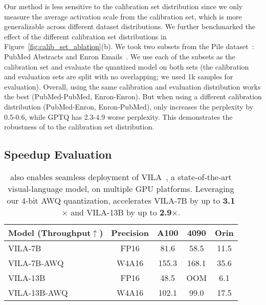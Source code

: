 Our method is less sensitive to the calibration set distribution since we only measure the average activation scale from the calibration set, which is more generalizable across different dataset distributions. We further benchmarked the effect of the different calibration set distributions in Figure~\ref{fig:calib_set_ablation}(b). We took two subsets from the Pile dataset~\cite{gao2020pile}: PubMed Abstracts and Enron Emails~\cite{klimt2004enron}. We use each of the subsets as the calibration set and evaluate the quantized model on both sets (the calibration and evaluation sets are split with no overlapping; we used 1k samples for evaluation). Overall, using the same calibration and evaluation distribution works the best (PubMed-PubMed, Enron-Enron). But when using a different calibration distribution (PubMed-Enron, Enron-PubMed), \methodshort only increases the perplexity by 0.5-0.6, while GPTQ has 2.3-4.9 worse perplexity. This demonstrates the robustness of \methodshort to the calibration set distribution. 

\subsection{Speedup Evaluation}
\begin{table}
    \setlength{\tabcolsep}{5pt}
    \small
    \centering
    \begin{tabular}{lcccc} \toprule
\textbf{Model (Throughput$\uparrow$)}          & Precision & A100 & 4090 & Orin \\ \midrule
VILA-7B      & FP16      & 81.6              & 58.5              & 11.5              \\
VILA-7B-AWQ  & W4A16     & 155.3             & 168.1             & 35.6              \\ \midrule
VILA-13B     & FP16      & 48.5              & OOM               & 6.1               \\
VILA-13B-AWQ & W4A16     & 102.1             & 99.0              & 17.5 \\\bottomrule             
\end{tabular}
    \caption{\system also enables seamless deployment of VILA~\cite{lin2023vila}, a state-of-the-art visual-language model, on multiple GPU platforms. Leveraging our 4-bit AWQ quantization, \system accelerates VILA-7B by up to \textbf{3.1$\times$} and VILA-13B by up to \textbf{2.9$\times$}.}
    \label{tab:vila_latency}
\end{table}

